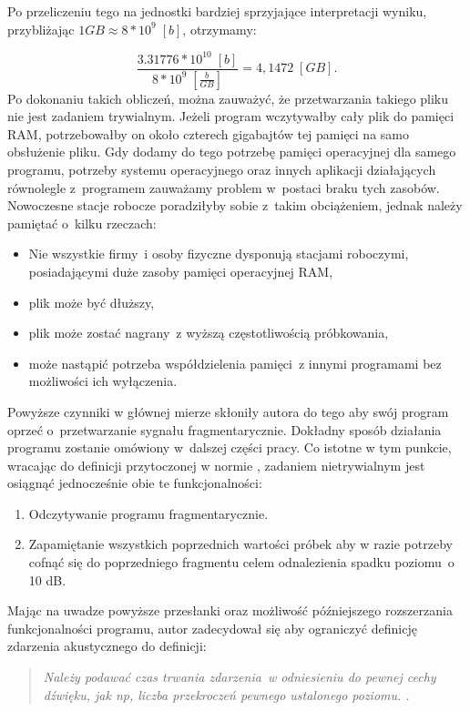 \documentclass[eng,printmode]{mgr}
\begin{document}
Po przeliczeniu tego na jednostki bardziej sprzyjające interpretacji wyniku, przybliżając $1GB \approx 8*10^9\;[b]$, otrzymamy:


\begin{equation}
\frac{3.31776*10^10\;[b]}{8*10^9\;[\frac{b}{GB}]} = 4,1472\;[GB].
\end{equation}
Po dokonaniu takich obliczeń, można zauważyć, że przetwarzania takiego pliku nie jest zadaniem trywialnym. Jeżeli program wczytywałby cały plik do pamięci RAM, potrzebowałby on około czterech gigabajtów tej pamięci na samo obsłużenie pliku. Gdy dodamy do tego potrzebę pamięci operacyjnej dla samego programu, potrzeby systemu operacyjnego oraz innych aplikacji działających równolegle z~programem zauważamy problem w~postaci braku tych zasobów. Nowoczesne stacje robocze poradziłyby sobie z~takim obciążeniem, jednak należy pamiętać o~kilku rzeczach:
\begin{itemize}
\item Nie wszystkie firmy~i osoby fizyczne dysponują stacjami roboczymi, posiadającymi duże zasoby pamięci operacyjnej RAM,
\item plik może być dłuższy,
\item plik może zostać nagrany~z wyższą częstotliwością próbkowania,
\item może nastąpić potrzeba współdzielenia pamięci~z innymi programami bez możliwości ich wyłączenia.
\end{itemize}

Powyższe czynniki w głównej mierze skłoniły autora do tego aby swój program oprzeć o~przetwarzanie sygnału fragmentarycznie. Dokładny sposób działania programu zostanie omówiony w~dalszej części pracy. Co istotne w tym punkcie, wracając do definicji przytoczonej w normie \cite{PN-ISO-1996-1:2006}, zadaniem nietrywialnym jest osiągnąć jednocześnie obie te funkcjonalności:
\begin{enumerate}
\item Odczytywanie programu fragmentarycznie.
\item Zapamiętanie wszystkich poprzednich wartości próbek aby w razie potrzeby cofnąć się do poprzedniego fragmentu celem odnalezienia spadku poziomu~o 10 dB.
\end{enumerate}

Mając na uwadze powyższe przesłanki oraz możliwość późniejszego rozszerzania funkcjonalności programu, autor zadecydował się aby ograniczyć definicję zdarzenia akustycznego do definicji:

\begin{quote}
\textit{Należy podawać czas trwania zdarzenia~w odniesieniu do pewnej cechy dźwięku, jak np, liczba przekroczeń pewnego ustalonego poziomu. \newline \cite{PN-ISO-1996-1:2006}.}
\end{quote}
\end{document}
